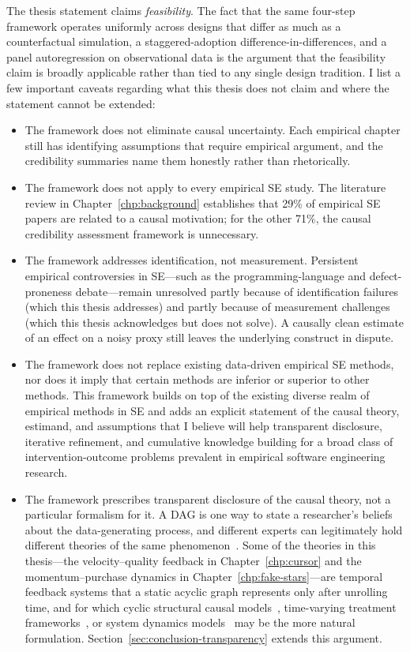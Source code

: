 The thesis statement claims \emph{feasibility}.
The fact that the same four-step framework operates uniformly across designs that differ as much as a counterfactual simulation, a staggered-adoption difference-in-differences, and a panel autoregression on observational data is the argument that the feasibility claim is broadly applicable rather than tied to any single design tradition.
I list a few important caveats regarding what this thesis does not claim and where the statement cannot be extended:
\begin{itemize}[leftmargin=20pt]
\item The framework does not eliminate causal uncertainty.
Each empirical chapter still has identifying assumptions that require empirical argument, and the credibility summaries name them honestly rather than rhetorically.
\item The framework does not apply to every empirical SE study.
The literature review in Chapter~\ref{chp:background} establishes that 29\% of empirical SE papers are related to a causal motivation; for the other 71\%, the causal credibility assessment framework is unnecessary.
\item The framework addresses identification, not measurement.
Persistent empirical controversies in SE---such as the programming-language and defect-proneness debate---remain unresolved partly because of identification failures (which this thesis addresses) and partly because of measurement challenges (which this thesis acknowledges but does not solve).
A causally clean estimate of an effect on a noisy proxy still leaves the underlying construct in dispute.
\item The framework does not replace existing data-driven empirical SE methods, nor does it imply that certain methods are inferior or superior to other methods.
This framework builds on top of the existing diverse realm of empirical methods in SE and adds an explicit statement of the causal theory, estimand, and assumptions that I believe will help transparent disclosure, iterative refinement, and cumulative knowledge building for a broad class of intervention-outcome problems prevalent in empirical software engineering research.
\item The framework prescribes transparent disclosure of the causal theory, not a particular formalism for it.
A DAG is one way to state a researcher's beliefs about the data-generating process, and different experts can legitimately hold different theories of the same phenomenon~\cite{DBLP:books/sp/08/SjobergDAH08, DBLP:journals/scp/StolF15}.
Some of the theories in this thesis---the velocity--quality feedback in Chapter~\ref{chp:cursor} and the momentum--purchase dynamics in Chapter~\ref{chp:fake-stars}---are temporal feedback systems that a static acyclic graph represents only after unrolling time, and for which cyclic structural causal models~\cite{bongers2021foundations}, time-varying treatment frameworks~\cite{robins1986new, hernan2020causal}, or system dynamics models~\cite{abdelhamid1991software, sterman2000business} may be the more natural formulation.
Section~\ref{sec:conclusion-transparency} extends this argument.
\end{itemize}

